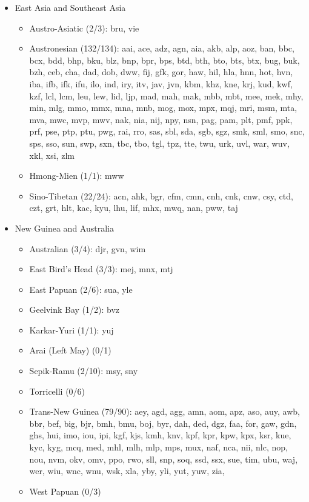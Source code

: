 \begin{itemize}[label={},leftmargin=!,labelindent=5pt,itemindent=-15pt]
  \item East Asia and Southeast Asia
    \begin{itemize}[label={},leftmargin=!,labelindent=5pt,itemindent=-15pt]
  	\item Austro-Asiatic (2/3): bru, vie
  	\item Austronesian (132/134): aai, ace, adz, agn, aia, akb, alp, aoz, ban, bbc, bcx, bdd, bhp, bku, blz, bnp, bpr, bps, btd, bth, bto, bts, btx, bug, buk, bzh, ceb, cha, dad, dob, dww, fij, gfk, gor, haw, hil, hla, hnn, hot, hvn, iba, ifb, ifk, ifu, ilo, ind, iry, itv, jav, jvn, kbm, khz, kne, krj, kud, kwf, kzf, lcl, lcm, leu, lew, lid, ljp, mad, mah, mak, mbb, mbt, mee, mek, mhy, min, mlg, mmo, mmx, mna, mnb, mog, mox, mpx, mqj, mri, msm, mta, mva, mwc, mvp, mwv, nak, nia, nij, npy, nsn, pag, pam, plt, pmf, ppk, prf, pse, ptp, ptu, pwg, rai, rro, sas, sbl, sda, sgb, sgz, smk, sml, smo, snc, sps, sso, sun, swp, sxn, tbc, tbo, tgl, tpz, tte, twu, urk, uvl, war, wuv, xkl, xsi, zlm
  	\item Hmong-Mien (1/1): mww
  	\item Sino-Tibetan (22/24): acn, ahk, bgr, cfm, cmn, cnh, cnk, cnw, csy, ctd, czt, grt, hlt, kac, kyu, lhu, lif, mhx, mwq, nan, pww, taj
    \end{itemize}

  \item New Guinea and Australia
    \begin{itemize}[label={},leftmargin=!,labelindent=5pt,itemindent=-15pt]
  	\item Australian (3/4): djr, gvn, wim
  	\item East Bird's Head (3/3): mej, mnx, mtj
  	\item East Papuan (2/6): sua, yle
  	\item Geelvink Bay (1/2): bvz
  	\item Karkar-Yuri (1/1): yuj
  	\item Arai (Left May) (0/1)
  	\item Sepik-Ramu (2/10): msy, sny
  	\item Torricelli (0/6)
  	\item Trans-New Guinea (79/90): aey, agd, agg, amn, aom, apz, aso, auy, awb, bbr, bef, big, bjr, bmh, bmu, boj, byr, dah, ded, dgz, faa, for, gaw, gdn, ghs, hui, imo, iou, ipi, kgf, kjs, kmh, knv, kpf, kpr, kpw, kpx, ksr, kue, kyc, kyg, mcq, med, mhl, mlh, mlp, mps, mux, naf, nca, nii, nlc, nop, nou, nvm, okv, omv, ppo, rwo, sll, snp, soq, ssd, ssx, sue, tim, ubu, waj, wer, wiu, wnc, wnu, wsk, xla, yby, yli, yut, yuw, zia,
  	\item West Papuan (0/3)
    \end{itemize}


\end{itemize}
